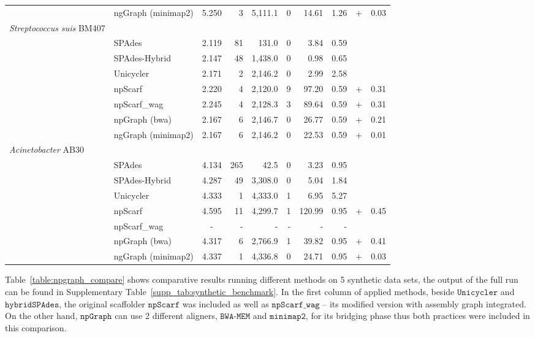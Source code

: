\documentclass[10pt,twocolumn,twoside]{genpaper}
\newcommand{\npscarf}{$\mathtt{npScarf}$}
\newcommand{\npscarfg}{$\mathtt{npScarf\_wag}$}
\newcommand{\npgraph}{$\mathtt{npGraph}$}
\newcommand{\unicycler}{$\mathtt{Unicycler}$}
\newcommand{\minimap}{$\mathtt{minimap2}$}
\newcommand{\bwa}{$\mathtt{BWA\text{-}MEM}$}
\begin{document}
\begin{longtable}{llcrrrrr@{\hspace{2pt}}c@{\hspace{2pt}}r}
 & ngGraph (minimap2)  & 5.250 & 3  & 5,111.1  & 0  & 14.61  &  1.26 & + & 0.03 \\
\rowcolor{Gray} \multicolumn{10}{l}
{\emph{Streptococcus suis} BM407} \\*  
 & SPAdes  & 2.119 &  81 &  131.0 & 0  & 3.84  & 0.59  &  &  \\*
 & SPAdes-Hybrid  & 2.147 & 48  &  1,438.0 &  0 &  0.98 & 0.65  &  &  \\*
 & Unicycler  & 2.171 &  2 &  2,146.2 & 0  &  2.99 &  2.58  &  &  \\*
 & npScarf  & 2.220 &  4 &  2,120.0  & 9  & 97.20  & 0.59 & + & 0.31 \\*
 & npScarf\_wag  & 2.245 & 4  &  2,128.3  & 3  &  89.64 & 0.59 & + &  0.31\\*
 & npGraph (bwa)  & 2.167 & 6  & 2,146.7  &  0 &  26.77 & 0.59  & + &  0.21\\*
 & ngGraph (minimap2)  & 2.167 & 6  &  2,146.2 &  0 & 22.53  &  0.59 & + & 0.01 \\
\rowcolor{Gray} \multicolumn{10}{l}
{\emph{Acinetobacter} AB30} \\*  
 & SPAdes  & 4.134 & 265  & 42.5  &  0 &  3.23 & 0.95  &  &  \\*
 & SPAdes-Hybrid  & 4.287 & 49  &  3,308.0 &  0 & 5.04  & 1.84  &  &  \\*
 & Unicycler  & 4.333 & 1  &  4,333.0 &  1 & 6.95  &  5.27 &  &  \\*
 & npScarf  & 4.595 & 11  & 4,299.7  & 1  & 120.99  & 0.95  & + & 0.45 \\*
 & npScarf\_wag  & - & -  &  - & -  &  - &  - &  &  \\*
 & npGraph (bwa)  & 4.317 & 6  &  2,766.9 & 1  &  39.82 &  0.95 & + & 0.41 \\*
 & ngGraph (minimap2)  & 4.337 & 1  &  4,336.8 & 0  & 24.71  & 0.95  & + & 0.03 \\
\end{longtable}

\normalsize

Table~\ref{table:npgraph_compare} shows comparative results running different methods on 5 synthetic data sets, the output of the full run can be found in Supplementary Table~\ref{supp_tab:synthetic_benchmark}.
In the first column of applied methods, beside \unicycler{} and $\mathtt{hybridSPAdes}$, the original scaffolder \npscarf{} was included as well as \npscarfg{} -- its modified version with assembly graph integrated.
On the other hand, \npgraph{} can use 2 different aligners, \bwa{} and \minimap{}, for its bridging phase thus both practices were included in this comparison.
\end{document}
